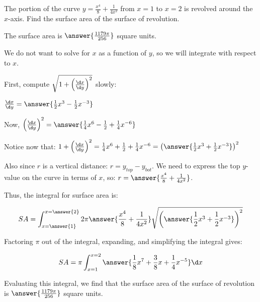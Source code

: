 \documentclass{ximera}
\author{Jim Talamo and Nicholas Hemleben}
\begin{document}
\begin{exercise}

The portion of the curve $y=\frac{x^4}{8} + \frac{1}{4x^2}$ from $x=1$ to $x=2$ is revolved around the $x$-axis.  Find the surface area of the surface of revolution.

The surface area is $\answer{ \frac {1179\pi }{256} }$ square units.

\begin{hint}
We do not want to solve for $x$ as a function of $y$, so we will integrate with respect to $x$.

\begin{question}
First, compute $\sqrt{1+\left(\frac{\d x}{\d y}\right)^2}$ slowly:

$\frac{\d x}{\d y} = \answer{\frac{1}{2}x^3 -\frac{1}{2} x^{-3}}$

\begin{question} 
Now, $\left(\frac{\d x}{\d y}\right)^2 = \answer{\frac{1}{4}x^6 - \frac{1}{2} + \frac{1}{4} x^{-6}}$

\begin{question}
Notice now that: 
$1+ \left(\frac{\d x}{\d y}\right)^2 = \frac{1}{4}x^6 + \frac{1}{2} + \frac{1}{4} x^{-6}=\left( \answer{ \frac {1}{2} x^3 + \frac{1}{2} x^{-3}}\right)^2$

\begin{question}
Also since $r$ is a vertical distance: $r=y_{top}-y_{bot}$.  We need to express the top $y$-value on the curve in terms of $x$, so: $r = \answer{\frac{x^4}{8} + \frac{1}{4x^2}}$.

\begin{question}
Thus, the integral for surface area is:

\[
SA = \int_{x=\answer{1}}^{x=\answer{2}} 2 \pi \answer{\frac{x^4}{8} + \frac{1}{4x^2}}\sqrt{\left(\answer{ \frac {1}{2} x^3 + \frac{1}{2} x^{-3}}\right)^2}
\]

\begin{question}
Factoring $\pi$ out of the integral, expanding, and simplifying the integral gives:

\[
SA= \pi \int_{x=1}^{x=2} \answer{\frac{1}{8} x^7 + \frac{3}{8} x + \frac{1}{4} x^{-5}} \d x 
\]

\end{question}
\end{question}
\end{question}
\end{question}
\end{question} 
\end{question}

\end{hint}

\begin{exercise}
Evaluating this integral, we find that the surface area of the surface of revolution is $\answer{ \frac {1179\pi }{256}}$ square units. 



\end{exercise}
\end{exercise}
\end{document}
